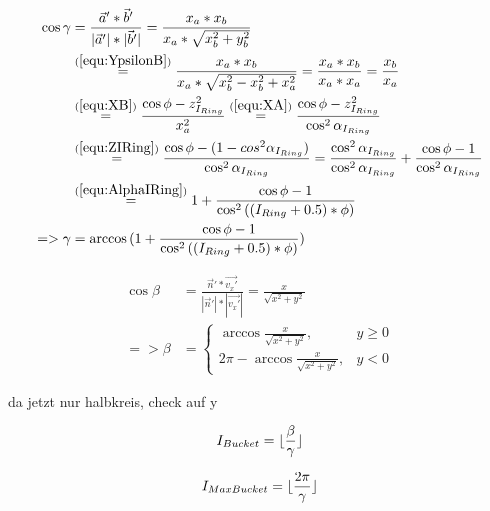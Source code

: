 \documentclass[../ClassicThesis.tex]{subfiles}
\begin{document}
\begin{equation}
\begin{split}
    \cos{\gamma}& = \frac{\vec{a}' * \vec{b}'}{|\vec{a}'| * |\vec{b}'|}
    = \frac{ x_{a} * x_{b} }{ x_{a} * \sqrt{  x_{b}^{2} +  y_{b}^{2} } } \\
    & \stackrel{(\ref{equ:YpsilonB})}{=} \frac{ x_{a} * x_{b} }{ x_{a} * \sqrt{  x_{b}^{2} - x_{b}^{2} +  x_{a}^{2} } }
    = \frac{ x_{a} * x_{b} }{ x_{a} * x_{a} }
    = \frac{ x_{b} }{ x_{a} } \\
    & \stackrel{(\ref{equ:XB})}{=} \frac{ \cos{\phi} - z_{I_{Ring}}^{2} }{ x_{a}^{2} }
    \stackrel{(\ref{equ:XA})}{=} \frac{ \cos{\phi} - z_{I_{Ring}}^{2} }{ \cos^{2}{{\alpha}_{I_{Ring}}} } \\
    & \stackrel{(\ref{equ:ZIRing})}{=} \frac{ \cos{\phi} - ( 1 - cos^{2}{{\alpha}_{I_{Ring}}} ) }{ \cos^{2}{{\alpha}_{I_{Ring}}} }
    = \frac{ \cos^{2}{{\alpha}_{I_{Ring}}} }{ \cos^{2}{{\alpha}_{I_{Ring}}} } + \frac{ \cos{\phi} - 1 }{ \cos^{2}{{\alpha}_{I_{Ring}}} } \\
    & \stackrel{(\ref{equ:AlphaIRing})}{=} 1 + \frac{ \cos{\phi} - 1 }{ \cos^{2}{( (I_{Ring} + 0.5) * \phi )} } \\
    => \gamma & = \arccos{( 1 + \frac{ \cos{\phi} - 1 }{ \cos^{2}{( (I_{Ring} + 0.5) * \phi )} } )}
\end{split}
\end{equation}

\begin{equation}
\begin{split}
    \cos{\beta} & = \frac{\vec{n}' * \vec{v_{x}'}}{|\vec{n}'| * |\vec{v_{x}'}|} = \frac{x}{\sqrt{x^{2} + y^{2}}} \\
    => \beta & = \begin{cases}
        \arccos{ \frac{x}{\sqrt{x^{2} + y^{2}}} }, & y \geq 0 \\
        2 \pi - \arccos{ \frac{x}{\sqrt{x^{2} + y^{2}}} }, & y < 0
    \end{cases}
\end{split}
\end{equation}

da jetzt nur halbkreis, check auf y

\begin{equation}
    I_{Bucket} = \lfloor\frac{\beta}{\gamma}\rfloor
\end{equation}

\begin{equation}
    I_{MaxBucket} = \lfloor\frac{2 \pi}{\gamma}\rfloor
\end{equation}




\end{document}
